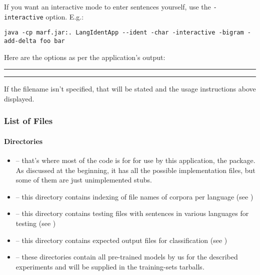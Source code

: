 If you want an interactive mode to enter sentences yourself, use the \verb+-interactive+
option. E.g.:

\verb+java -cp marf.jar:. LangIdentApp --ident -char -interactive -bigram -add-delta foo bar+

Here are the options as per the application's output:

\vspace{15pt}
\hrule

\hrule
\vspace{15pt}

If the filename isn't specified, that will be stated and the usage
instructions above displayed.

\subsubsection{List of Files}

\paragraph{Directories}

\begin{itemize}

\item
{} -- that's where most of the code is for for use by this application, the  package.
As discussed at the beginning, it has all the possible implementation files, but some of them are just
unimplemented stubs.

\item
{} -- this directory contains indexing of file names of corpora per language
(see )

\item
{} -- this directory contains testing files with sentences in various languages for testing
(see )

\item
{} -- this directory contains expected output files for classification
(see )


\item
{} -- these directories contain all pre-trained models by us
for the described experiments and will be supplied in the training-sets tarballs.

\end{itemize}


